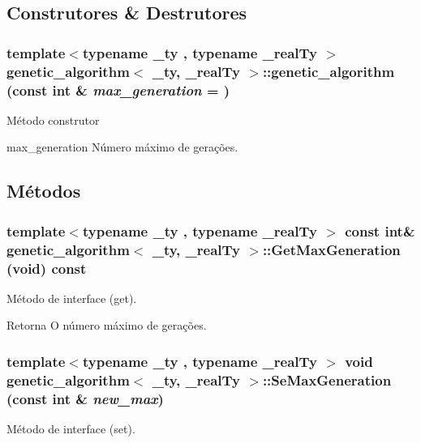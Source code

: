 \subsection{Construtores \& Destrutores}
\hypertarget{classgenetic__algorithm_af33b707193eeea4557c46ddb0bde22b6}{
\subsubsection[{genetic\_\-algorithm}]{\setlength{\rightskip}{0pt plus 5cm}template$<$typename \_\-ty , typename \_\-realTy $>$ {\bf genetic\_\-algorithm}$<$ \_\-ty, \_\-realTy $>$::{\bf genetic\_\-algorithm} (const int \& {\em max\_\-generation} = {})}}
\label{classgenetic__algorithm_af33b707193eeea4557c46ddb0bde22b6}
Método construtor

max\_\-generation Número máximo de gerações. 

\subsection{Métodos}
\hypertarget{classgenetic__algorithm_ab125057b9774303bab463defd29000e1}{
\subsubsection[{GetMaxGeneration}]{\setlength{\rightskip}{0pt plus 5cm}template$<$typename \_\-ty , typename \_\-realTy $>$ const int\& {\bf genetic\_\-algorithm}$<$ \_\-ty, \_\-realTy $>$::GetMaxGeneration (void) const}}
\label{classgenetic__algorithm_ab125057b9774303bab463defd29000e1}
Método de interface (get).

\begin{DoxyReturn}{Retorna}
O número máximo de gerações. 
\end{DoxyReturn}
\hypertarget{classgenetic__algorithm_ad7e8c1a4ce92a617bf2d2a4496a4a31b}{
\subsubsection[{SeMaxGeneration}]{\setlength{\rightskip}{0pt plus 5cm}template$<$typename \_\-ty , typename \_\-realTy $>$ void {\bf genetic\_\-algorithm}$<$ \_\-ty, \_\-realTy $>$::SeMaxGeneration (const int \& {\em new\_\-max})}}
\label{classgenetic__algorithm_ad7e8c1a4ce92a617bf2d2a4496a4a31b}
Método de interface (set).

